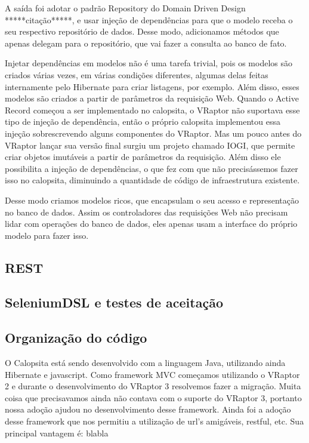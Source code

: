 A saída foi adotar o padrão Repository do Domain Driven Design *****citação*****, e usar injeção de dependências para
que o modelo receba o seu respectivo repositório de dados. Desse modo, adicionamos métodos que apenas delegam para o
repositório, que vai fazer a consulta ao banco de fato.

Injetar dependências em modelos não é uma tarefa trivial, pois os modelos são criados várias vezes, em várias condições
diferentes, algumas delas feitas internamente pelo Hibernate para criar listagens, por exemplo. Além disso, esses
modelos são criados a partir de parâmetros da requisição Web. Quando o Active Record começou a ser implementado no 
calopsita, o VRaptor não suportava esse tipo de injeção de dependência, então o próprio calopsita implementou essa
injeção sobrescrevendo alguns componentes do VRaptor. Mas um pouco antes do VRaptor lançar sua versão final surgiu
um projeto \opensource chamado IOGI, que permite criar objetos imutáveis a partir de parâmetros da requisição.
Além disso ele possibilita a injeção de dependências, o que fez com que não precisássemos fazer isso no calopsita,
diminuindo a quantidade de código de infraestrutura existente.

Desse modo criamos modelos ricos, que encapsulam o seu acesso e representação no banco de dados. Assim os controladores
das requisições Web não precisam lidar com operações do banco de dados, eles apenas usam a interface do próprio modelo
para fazer isso.


\subsection{REST}

\subsection{SeleniumDSL e testes de aceitação}

\subsection{Organização do código}
O Calopsita está sendo desenvolvido com a linguagem Java, utilizando ainda Hibernate e javascript. Como framework MVC começamos utilizando o VRaptor 2 e durante o desenvolvimento do VRaptor 3 resolvemos fazer a migração. Muita coisa que precisavamos ainda não contava com o suporte do VRaptor 3, portanto nossa adoção ajudou no desenvolvimento desse framework. Ainda foi a adoção desse framework que nos permitiu a utilização de url's amigáveis, restful, etc. Sua principal vantagem é: blabla





